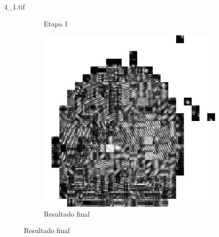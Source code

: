 \documentclass{beamer}
\begin{document}
\begin{frame}{4\_1.tif}
\begin{figure}
\begin{subfigure}[!ht]{0.32\textwidth}
                \caption{Etapa 1}
            \end{subfigure}
            \begin{subfigure}[!ht]{0.32\textwidth}
                \includegraphics[width=\columnwidth]{Fingerprints/4_1_final.jpg}
                \caption{Resultado final}
            \end{subfigure}
        \end{figure}
    \end{frame}
\end{document}
